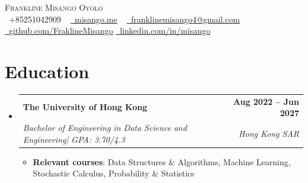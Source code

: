 \documentclass[letterpaper,10.5pt]{article}
\makeatletter
\newcommand{\resumeItem}[1]{
  \item\small{
    {#1 \vspace{-2pt}}
  }
}
\newcommand{\resumeSubheading}[4]{
  \vspace{-2pt}\item
    \begin{tabular*}{1.0\textwidth}[t]{l@{\extracolsep{\fill}}r}
      \textbf{#1} & \textbf{\small #2} \\
      \textit{\small#3} & \textit{\small #4} \\
    \end{tabular*}\vspace{-7pt}
}
\newcommand{\resumeSubHeadingListStart}{\begin{itemize}[leftmargin=0.0in, label={}]}
\newcommand{\resumeSubHeadingListEnd}{\end{itemize}}
\newcommand{\resumeItemListStart}{\begin{itemize}}
\newcommand{\resumeItemListEnd}{\end{itemize}\vspace{-5pt}}
\makeatother
\begin{document}
\begin{center}
    {\Huge \scshape Frankline Misango Oyolo } \\ \vspace{1pt}
    \small \raisebox{-0.1\height}\faPhone\ +85251042909 ~ 
    \href{https://misango.me/}{\raisebox{-0.2\height}\faGlobe\  
    \underline{misango.me}} ~ 
    \href{mailto:franklinemisango4@gmail.com}{\raisebox{-0.2\height}\faEnvelope\  \underline{franklinemisango4@gmail.com}} ~ 
    \href{https://github.com/FranklineMisango}{\raisebox{-0.2\height}\faGithub\ \underline{github.com/FraklineMisango}}
    \href{https://linkedin.com/in/misango}{\raisebox{-0.2\height}\faLinkedin\ \underline{linkedin.com/in/misango}} ~

    \vspace{-10pt}
\end{center}

\section{Education}
  \resumeSubHeadingListStart
    \resumeSubheading
      {The University of Hong Kong}{Aug 2022 -- Jun 2027}
      {Bachelor of Engineering in Data Science and Engineering| GPA: 3.70/4.3}{Hong Kong SAR}
      \resumeItemListStart
        \resumeItem{\textbf{Relevant courses}: Data Structures \& Algorithms, Machine Learning, Stochastic Calculus, Probability \& Statistics}
        \vspace{-2.5pt}
      \resumeItemListEnd
  \resumeSubHeadingListEnd
\vspace{-11pt}


\end{document}

